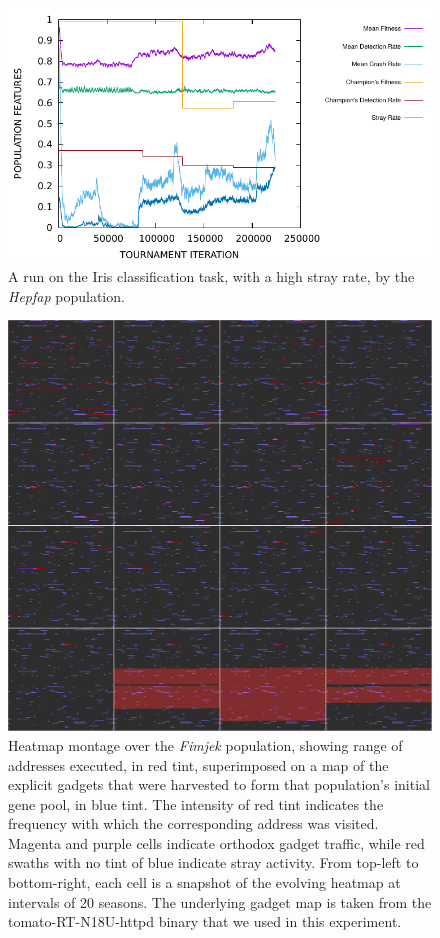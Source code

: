 \documentclass[12pt,glossary]{dalthesis}
\begin{document}
\begin{figure}[htbp]
\centering
\includegraphics[width=.9\linewidth]{../images/plots/hepfap.pdf}
\caption{\label{fig:org2319962}
A run on the Iris classification task, with a high stray rate, by the \emph{Hepfap} population.}
\end{figure}

\begin{figure}[htbp]
\centering
\includegraphics[width=.9\linewidth]{../images/plots/fimjek_heatmap_montage.pdf}
\caption{\label{fig:org8971d65}
Heatmap montage over the \emph{Fimjek} population, showing range of addresses executed, in red tint, superimposed on a map of the explicit gadgets that were harvested to form that population's initial gene pool, in blue tint. The intensity of red tint indicates the frequency with which the corresponding address was visited. Magenta and purple cells indicate orthodox gadget traffic, while red swaths with no tint of blue indicate stray activity. From top-left to bottom-right, each cell is a snapshot of the evolving heatmap at intervals of 20 seasons. The underlying gadget map is taken from the tomato-RT-N18U-httpd binary that we used in this experiment.}
\end{figure}
\end{document}
